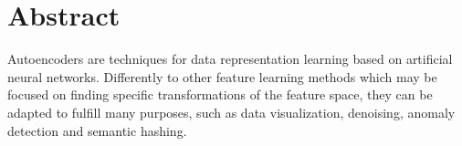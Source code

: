
%
%
%
\section*{Abstract}

Autoencoders are techniques for data representation learning based on artificial neural networks. Differently to other feature learning methods which may be focused on finding specific transformations of the feature space, they can be adapted to fulfill many purposes, such as data visualization, denoising, anomaly detection and semantic hashing. 

